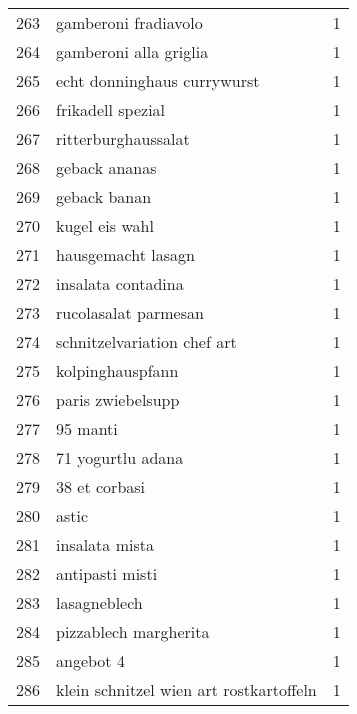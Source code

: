 \begin{tabular}{llr}
263 &                               gamberoni fradiavolo &      1 \\
264 &                             gamberoni alla griglia &      1 \\
265 &                        echt donninghaus currywurst &      1 \\
266 &                                  frikadell spezial &      1 \\
267 &                                ritterburghaussalat &      1 \\
268 &                                      geback ananas &      1 \\
269 &                                       geback banan &      1 \\
270 &                                     kugel eis wahl &      1 \\
271 &                                 hausgemacht lasagn &      1 \\
272 &                                 insalata contadina &      1 \\
273 &                               rucolasalat parmesan &      1 \\
274 &                        schnitzelvariation chef art &      1 \\
275 &                                   kolpinghauspfann &      1 \\
276 &                                  paris zwiebelsupp &      1 \\
277 &                                           95 manti &      1 \\
278 &                                  71 yogurtlu adana &      1 \\
279 &                                      38 et corbasi &      1 \\
280 &                                              astic &      1 \\
281 &                                     insalata mista &      1 \\
282 &                                    antipasti misti &      1 \\
283 &                                       lasagneblech &      1 \\
284 &                              pizzablech margherita &      1 \\
285 &                                          angebot 4 &      1 \\
286 &            klein schnitzel wien art rostkartoffeln &      1 \\

\end{tabular}
